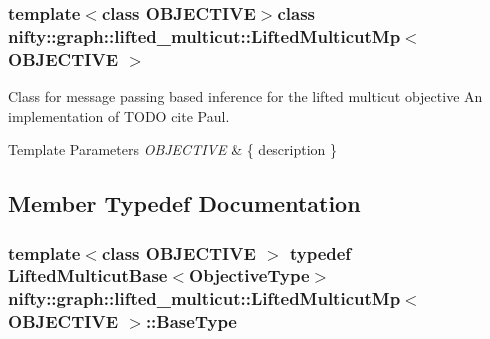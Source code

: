 \subsubsection*{template$<$class O\+B\+J\+E\+C\+T\+I\+V\+E$>$class nifty\+::graph\+::lifted\+\_\+multicut\+::\+Lifted\+Multicut\+Mp$<$ O\+B\+J\+E\+C\+T\+I\+V\+E $>$}

Class for message passing based inference for the lifted multicut objective An implementation of T\+O\+D\+O cite Paul. 


\begin{DoxyTemplParams}{Template Parameters}
{\em O\+B\+J\+E\+C\+T\+I\+V\+E} & \{ description \} \\
\hline
\end{DoxyTemplParams}


\subsection{Member Typedef Documentation}
\hypertarget{classnifty_1_1graph_1_1lifted__multicut_1_1LiftedMulticutMp_a1970d0f11c6f47d763b4e102a3ea9213}{}
\subsubsection[{Base\+Type}]{\setlength{\rightskip}{0pt plus 5cm}template$<$class O\+B\+J\+E\+C\+T\+I\+V\+E $>$ typedef {\bf Lifted\+Multicut\+Base}$<${\bf Objective\+Type}$>$ {\bf nifty\+::graph\+::lifted\+\_\+multicut\+::\+Lifted\+Multicut\+Mp}$<$ O\+B\+J\+E\+C\+T\+I\+V\+E $>$\+::{\bf Base\+Type}}\label{classnifty_1_1graph_1_1lifted__multicut_1_1LiftedMulticutMp_a1970d0f11c6f47d763b4e102a3ea9213}
\hypertarget{classnifty_1_1graph_1_1lifted__multicut_1_1LiftedMulticutMp_a66bb20962d2d51acdfa1ba2e12156b61}{}
